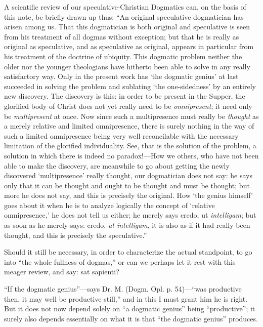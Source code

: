 \documentclass[12pt,a4paper,openany]{book}
\newcommand{\opage}[1]{\marginnote{\footnotesize\textit{[#1]}}}
\begin{document}
A scientific review of our speculative-Christian
Dogmatics can, on the basis of this note, be briefly drawn up
thus: ``An original speculative dogmatician has
arisen among us. That this dogmatician is both original
and speculative is seen from his treatment of all dogmas
without exception; but that he is really as original
as speculative, and as speculative as original, appears
in particular from his treatment of the doctrine of ubiquity.
This dogmatic problem neither the older nor the
younger theologians have hitherto been able to solve in any really satisfactory
way. Only in the present work has
`the dogmatic genius' at last succeeded in solving the problem and
sublating `the one-sidedness' by an entirely new discovery. The discovery
is this: in order to be present in the Supper,
the glorified body of Christ does not yet really need to
be \emph{omnipresent}; it need only be
\emph{multipresent} at once. Now since such
a multipresence must really be \emph{thought} as a
merely relative and limited omnipresence, there is surely
\setcounter{footnote}{0}%
\opage{32}nothing in the way of such a limited omnipresence
being very well reconcilable with the necessary limitation of the glorified individuality.
See, that is the solution of the problem,
a solution in which there is indeed no paradox!---How
we others, who have not been able to make the discovery, are meanwhile
to go about getting the newly discovered
`multipresence' really thought, our dogmatician does
not say: he says only that it can be thought and ought to be thought and
must be thought; but more he does not say, and this is precisely the
original. How `the genius himself' goes about it when
he is to analyze logically the concept of `relative omnipresence,'
he does not tell us either; he merely says credo, ut
\textit{intelligam}; but as soon as he merely says: credo, \textit{ut intelligam},
it is also as if it had really been thought, and
this is precisely the speculative.''

Should it still be necessary, in order to characterize the actual
standpoint, to go into ``the
whole fullness of dogmas,'' or can we perhaps let it
rest with this meager review, and say: sat sapienti?

``If the dogmatic genius''---says Dr. M.
(Dogm. Opl. p. 54)---``was productive then, it may
well be productive still,'' and in this I must grant him he is
right. But it does not now depend solely on
``a dogmatic genius'' being ``productive''; it surely also depends
essentially on what it is that ``the dogmatic genius''
produces.
\end{document}
